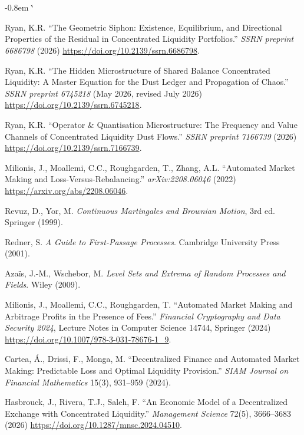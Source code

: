 \documentclass[11pt,a4paper]{article}
\makeatletter
\renewenvironment{thebibliography}[1]
  {\section*{\refname}%
   \fontsize{10pt}{12pt}\selectfont
   \list{\@biblabel{\@arabic\c@enumiv}}%
        {\settowidth\labelwidth{\@biblabel{#1}}%
         \leftmargin\labelwidth
         \advance\leftmargin-0.8em
         \advance\leftmargin\labelsep
         \setlength\itemindent{1em}%
         \setlength\itemsep{6pt plus 1pt minus 1pt}%
         \setlength\parsep{0pt}%
         \usecounter{enumiv}%
         \let\p@enumiv\@empty
         \renewcommand\theenumiv{\@arabic\c@enumiv}}%
   \sloppy\clubpenalty4000\widowpenalty4000\sfcode`\.\@m}
  {\def\@noitemerr{\@latex@warning{Empty `thebibliography' environment}}%
   \endlist}
\theoremstyle{definition}
\theoremstyle{plain}
\theoremstyle{remark}
\makeatother
\begin{document}
\begin{thebibliography}{45}

Ryan, K.R. ``The Geometric Siphon: Existence, Equilibrium, and Directional Properties of the Residual in Concentrated Liquidity Portfolios.'' \emph{SSRN preprint 6686798} (2026) \url{https://doi.org/10.2139/ssrn.6686798}.

Ryan, K.R. ``The Hidden Microstructure of Shared Balance Concentrated Liquidity: A Master Equation for the Dust Ledger and Propagation of Chaos.'' \emph{SSRN preprint 6745218} (May 2026, revised July 2026) \url{https://doi.org/10.2139/ssrn.6745218}.

Ryan, K.R. ``Operator \& Quantisation Microstructure: The Frequency and Value Channels of Concentrated Liquidity Dust Flows.'' \emph{SSRN preprint 7166739} (2026) \url{https://doi.org/10.2139/ssrn.7166739}.

Milionis, J., Moallemi, C.C., Roughgarden, T., Zhang, A.L. ``Automated Market Making and Loss-Versus-Rebalancing.'' \emph{arXiv:2208.06046} (2022) \url{https://arxiv.org/abs/2208.06046}.

Revuz, D., Yor, M. \emph{Continuous Martingales and Brownian Motion}, 3rd ed. Springer (1999).

Redner, S. \emph{A Guide to First-Passage Processes}. Cambridge University Press (2001).

Aza\"is, J.-M., Wschebor, M. \emph{Level Sets and Extrema of Random Processes and Fields}. Wiley (2009).

Milionis, J., Moallemi, C.C., Roughgarden, T. ``Automated Market Making and Arbitrage Profits in the Presence of Fees.'' \emph{Financial Cryptography and Data Security 2024}, Lecture Notes in Computer Science 14744, Springer (2024) \url{https://doi.org/10.1007/978-3-031-78676-1_9}.

Cartea, \'A., Drissi, F., Monga, M. ``Decentralized Finance and Automated Market Making: Predictable Loss and Optimal Liquidity Provision.'' \emph{SIAM Journal on Financial Mathematics} 15(3), 931--959 (2024).

Hasbrouck, J., Rivera, T.J., Saleh, F. ``An Economic Model of a Decentralized Exchange with Concentrated Liquidity.'' \emph{Management Science} 72(5), 3666--3683 (2026) \url{https://doi.org/10.1287/mnsc.2024.04510}.


\end{thebibliography}
\end{document}
